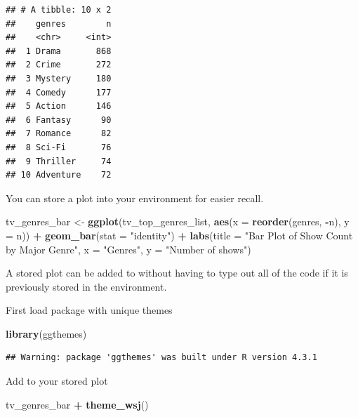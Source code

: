 \documentclass[
  b5paper]{book}
\newenvironment{Shaded}{\begin{snugshade}}{\end{snugshade}}
\newcommand{\AttributeTok}[1]{\textcolor[rgb]{0.13,0.29,0.53}{#1}}
\newcommand{\FunctionTok}[1]{\textcolor[rgb]{0.13,0.29,0.53}{\textbf{#1}}}
\newcommand{\NormalTok}[1]{#1}
\newcommand{\OtherTok}[1]{\textcolor[rgb]{0.56,0.35,0.01}{#1}}
\newcommand{\SpecialCharTok}[1]{\textcolor[rgb]{0.81,0.36,0.00}{\textbf{#1}}}
\newcommand{\StringTok}[1]{\textcolor[rgb]{0.31,0.60,0.02}{#1}}
\begin{document}
\begin{verbatim}
## # A tibble: 10 x 2
##    genres        n
##    <chr>     <int>
##  1 Drama       868
##  2 Crime       272
##  3 Mystery     180
##  4 Comedy      177
##  5 Action      146
##  6 Fantasy      90
##  7 Romance      82
##  8 Sci-Fi       76
##  9 Thriller     74
## 10 Adventure    72
\end{verbatim}

You can store a plot into your environment for easier recall.

\begin{Shaded}
\begin{Highlighting}[]
\NormalTok{tv\_genres\_bar }\OtherTok{\textless{}{-}} \FunctionTok{ggplot}\NormalTok{(tv\_top\_genres\_list, }\FunctionTok{aes}\NormalTok{(}\AttributeTok{x =} \FunctionTok{reorder}\NormalTok{(genres, }\SpecialCharTok{{-}}\NormalTok{n), }\AttributeTok{y =}\NormalTok{ n)) }\SpecialCharTok{+}
  \FunctionTok{geom\_bar}\NormalTok{(}\AttributeTok{stat =} \StringTok{"identity"}\NormalTok{) }\SpecialCharTok{+}
  \FunctionTok{labs}\NormalTok{(}\AttributeTok{title =} \StringTok{"Bar Plot of Show Count by Major Genre"}\NormalTok{,}
       \AttributeTok{x =} \StringTok{"Genres"}\NormalTok{,}
       \AttributeTok{y =} \StringTok{"Number of shows"}\NormalTok{)}
\end{Highlighting}
\end{Shaded}

A stored plot can be added to without having to type out all of the code if it is previously stored in the environment.

First load package with unique themes

\begin{Shaded}
\begin{Highlighting}[]
\FunctionTok{library}\NormalTok{(ggthemes)}
\end{Highlighting}
\end{Shaded}

\begin{verbatim}
## Warning: package 'ggthemes' was built under R version 4.3.1
\end{verbatim}

Add to your stored plot

\begin{Shaded}
\begin{Highlighting}[]
\NormalTok{tv\_genres\_bar }\SpecialCharTok{+}
  \FunctionTok{theme\_wsj}\NormalTok{()}
\end{Highlighting}
\end{Shaded}
\end{document}
